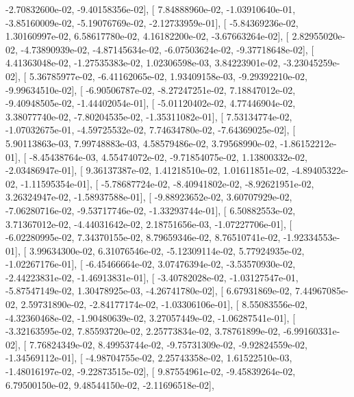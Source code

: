 \documentclass{article}
\begin{document}
         -2.70832600e-02,  -9.40158356e-02],
       [  7.84888960e-02,  -1.03910640e-01,  -3.85160009e-02,
         -5.19076769e-02,  -2.12733959e-01],
       [ -5.84369236e-02,   1.30160997e-02,   6.58617780e-02,
          4.16182200e-02,  -3.67663264e-02],
       [  2.82955020e-02,  -4.73890939e-02,  -4.87145634e-02,
         -6.07503624e-02,  -9.37718648e-02],
       [  4.41363048e-02,  -1.27535383e-02,   1.02306598e-03,
          3.84223901e-02,  -3.23045259e-02],
       [  5.36785977e-02,  -6.41162065e-02,   1.93409158e-03,
         -9.29392210e-02,  -9.99634510e-02],
       [ -6.90506787e-02,  -8.27247251e-02,   7.18847012e-02,
         -9.40948505e-02,  -1.44402054e-01],
       [ -5.01120402e-02,   4.77446904e-02,   3.38077740e-02,
         -7.80204535e-02,  -1.35311082e-01],
       [  7.53134774e-02,  -1.07032675e-01,  -4.59725532e-02,
          7.74634780e-02,  -7.64369025e-02],
       [  5.90113863e-03,   7.99748883e-03,   4.58579486e-02,
          3.79568990e-02,  -1.86152212e-01],
       [ -8.45438764e-03,   4.55474072e-02,  -9.71854075e-02,
          1.13800332e-02,  -2.03486947e-01],
       [  9.36137387e-02,   1.41218510e-02,   1.01611851e-02,
         -4.89405322e-02,  -1.11595354e-01],
       [ -5.78687724e-02,  -8.40941802e-02,  -8.92621951e-02,
          3.26324947e-02,  -1.58937588e-01],
       [ -9.88923652e-02,   3.60707929e-02,  -7.06280716e-02,
         -9.53717746e-02,  -1.33293744e-01],
       [  6.50882553e-02,   3.71367012e-02,  -4.44031642e-02,
          2.18751656e-03,  -1.07227706e-01],
       [ -6.02280995e-02,   7.34370155e-02,   8.79659346e-02,
          8.76510741e-02,  -1.92334553e-01],
       [  3.99634300e-02,   6.31076546e-02,  -5.12309114e-02,
          5.77924935e-02,  -1.02267176e-01],
       [ -6.45466664e-02,   3.07476394e-02,  -3.53570930e-02,
         -2.44223831e-02,  -1.46913831e-01],
       [ -3.40782028e-02,  -1.03127547e-01,  -5.87547149e-02,
          1.30478925e-03,  -4.26741780e-02],
       [  6.67931869e-02,   7.44967085e-02,   2.59731890e-02,
         -2.84177174e-02,  -1.03306106e-01],
       [  8.55083556e-02,  -4.32360468e-02,  -1.90480639e-02,
          3.27057449e-02,  -1.06287541e-01],
       [ -3.32163595e-02,   7.85593720e-02,   2.25773834e-02,
          3.78761899e-02,  -6.99160331e-02],
       [  7.76824349e-02,   8.49953744e-02,  -9.75731309e-02,
         -9.92824559e-02,  -1.34569112e-01],
       [ -4.98704755e-02,   2.25743358e-02,   1.61522510e-03,
         -1.48016197e-02,  -9.22873515e-02],
       [  9.87554961e-02,  -9.45839264e-02,   6.79500150e-02,
          9.48544150e-02,  -2.11696518e-02],
\end{document}
